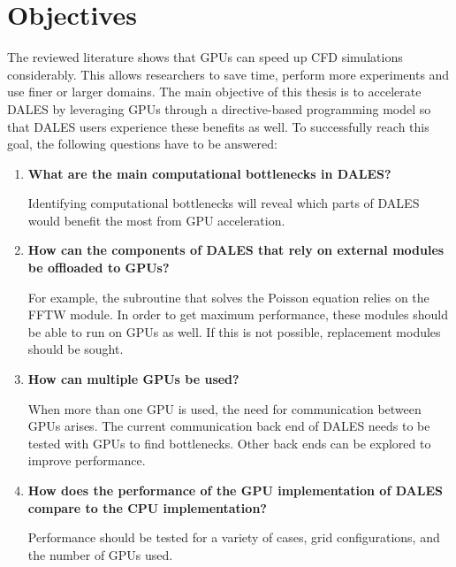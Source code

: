 \section{Objectives}
The reviewed literature shows that GPUs can speed up CFD simulations considerably. This allows researchers to save time, perform more experiments and use finer or larger domains. The main objective of this thesis is to accelerate DALES by leveraging GPUs through a directive-based programming model so that DALES users experience these benefits as well. To successfully reach this goal, the following questions have to be answered:

\begin{enumerate}
    \item \textbf{What are the main computational bottlenecks in DALES?}
    
    Identifying computational bottlenecks will reveal which parts of DALES would benefit the most from GPU acceleration. 
    
    \item \textbf{How can the components of DALES that rely on external modules be offloaded to GPUs?}
    
    For example, the subroutine that solves the Poisson equation relies on the FFTW module. In order to get maximum performance, these modules should be able to run on GPUs as well. If this is not possible, replacement modules should be sought.
    
    \item \textbf{How can multiple GPUs be used?}

    When more than one GPU is used, the need for communication between GPUs arises. The current communication back end of DALES needs to be tested with GPUs to find bottlenecks. Other back ends can be explored to improve performance. 
    
    \item \textbf{How does the performance of the GPU implementation of DALES compare to the CPU implementation?}
    
    Performance should be tested for a variety of cases, grid configurations, and the number of GPUs used.
    
\end{enumerate}